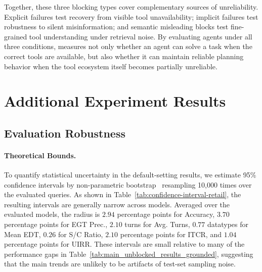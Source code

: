 Together, these three blocking types cover complementary sources of unreliability. 
Explicit failures test recovery from visible tool unavailability; implicit failures test robustness to silent misinformation; and semantic misleading blocks test fine-grained tool understanding under retrieval noise. 
By evaluating agents under all three conditions, \bench{} measures not only whether an agent can solve a task when the correct tools are available, but also whether it can maintain reliable planning behavior when the tool ecosystem itself becomes partially unreliable.



\section{Additional Experiment Results}
\label{app:additional-experiment-results}

\subsection{Evaluation Robustness}
\label{app:evaluation-robustness}



\paragraph{Theoretical Bounds.} To quantify statistical uncertainty in the default-setting results, we estimate 95\% confidence intervals by non-parametric bootstrap~\cite{justus2024bootstrap,marcon,wang2025diversity,wang2025prospect,zong2025critical} resampling 10,000 times over the evaluated queries.
As shown in Table~\ref{tab:confidence-interval-retail}, the resulting intervals are generally narrow across models. 
Averaged over the evaluated models, the radius is $2.94$ percentage points for Accuracy, $3.70$ percentage points for EGT Prec., $2.10$ turns for Avg. Turns, $0.77$ datatypes for Mean EDT, $0.26$ for S/C Ratio, $2.10$ percentage points for ITCR, and $1.04$ percentage points for UIRR. 
These intervals are small relative to many of the performance gaps in Table~\ref{tab:main_unblocked_results_grounded}, suggesting that the main trends are unlikely to be artifacts of test-set sampling noise.

